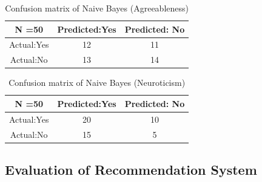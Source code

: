 \begin{table}[!ht]
\centering
\begin{tabular}{ |c|c|c| } 
 \hline
 N =50 & Predicted:Yes & Predicted: No \\
 \hline
 Actual:Yes&12 & 11 \\ 
 \hline
 Actual:No&13 & 14 \\ 
 \hline
\end{tabular}
 \caption{Confusion matrix of Naive Bayes (Agreeableness)}
\end{table}

\begin{table}[!ht]
\centering
\begin{tabular}{ |c|c|c| } 
 \hline
 N =50 & Predicted:Yes & Predicted: No \\
 \hline
 Actual:Yes&20 & 10 \\ 
 \hline
 Actual:No&15 & 5 \\ 
 \hline
\end{tabular}
 \caption{Confusion matrix of Naive Bayes (Neuroticism)}
\end{table}


\subsection{Evaluation of Recommendation System}
